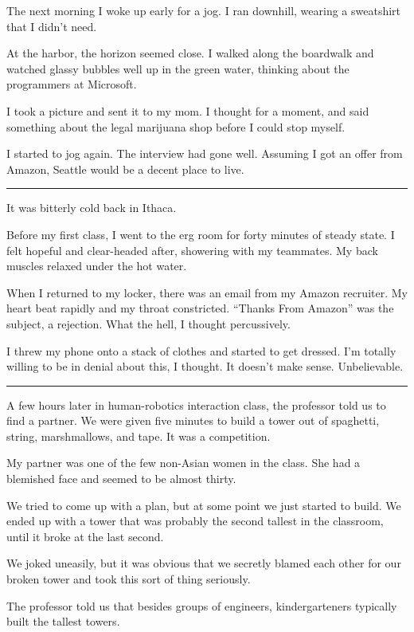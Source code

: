 The next morning I woke up early for a jog.  I ran downhill, wearing a
sweatshirt that I didn't need.

At the harbor, the horizon seemed close.  I walked along the boardwalk and
watched glassy bubbles well up in the green water, thinking about the
programmers at Microsoft.

I took a picture and sent it to my mom.  I thought for a moment, and said
something about the legal marijuana shop before I could stop myself.

I started to jog again.  The interview had gone well.  Assuming I got an offer
from Amazon, Seattle would be a decent place to live.

\plainfancybreak{12pt}{2}{}

It was bitterly cold back in Ithaca.

Before my first class, I went to the erg room for forty minutes of steady state.
I felt hopeful and clear-headed after, showering with my teammates.  My back
muscles relaxed under the hot water.

When I returned to my locker, there was an email from my Amazon recruiter.  My
heart beat rapidly and my throat constricted.  ``Thanks From Amazon'' was the
subject, a rejection.  What the hell, I thought percussively.

I threw my phone onto a stack of clothes and started to get dressed.  I'm
totally willing to be in denial about this, I thought.  It doesn't make sense.
Unbelievable.

\plainfancybreak{12pt}{2}{}

A few hours later in human-robotics interaction class, the professor told us to find a
partner.  We were given five minutes to build a tower out of spaghetti, string,
marshmallows, and tape.  It was a competition.

My partner was one of the few non-Asian women in the class.  She had a blemished
face and seemed to be almost thirty.

We tried to come up with a plan, but at some point we just started to build. We
ended up with a tower that was probably the second tallest in the classroom,
until it broke at the last second.

We joked uneasily, but it was obvious that we secretly blamed each other for our
broken tower and took this sort of thing seriously.

The professor told us that besides groups of engineers, kindergarteners
typically built the tallest towers.

